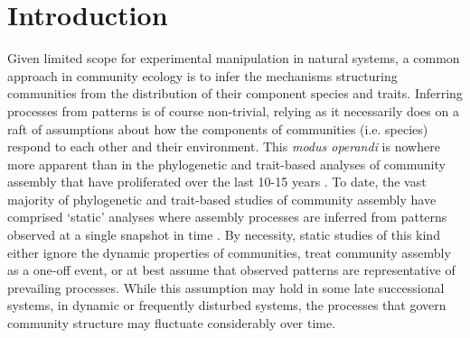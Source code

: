 \newpage
\section{Introduction}

Given limited scope for experimental manipulation in natural systems, a common approach in community ecology is to infer the mechanisms structuring communities from the distribution of their component species and traits. Inferring processes from patterns is of course non-trivial, relying as it necessarily does on a raft of assumptions about how the components of communities (i.e. species) respond to each other and their environment. This \textit{modus operandi} is nowhere more apparent than in the phylogenetic and trait-based analyses of community assembly that have proliferated over the last 10-15 years \citep[e.g.][]{Webb2000, Cornwell2009, Kraft2010}. To date, the vast majority of phylogenetic and trait-based studies of community assembly have comprised `static' analyses where assembly processes are inferred from patterns observed at a single snapshot in time \citep[as reviewed in][]{Swenson2013, Gotzenberger2012}. By necessity, static studies of this kind either ignore the dynamic properties of communities, treat community assembly as a one-off event, or at best assume that observed patterns are representative of prevailing processes. While this assumption may hold in some late successional systems, in dynamic or frequently disturbed systems, the processes that govern community structure may fluctuate considerably over time.

